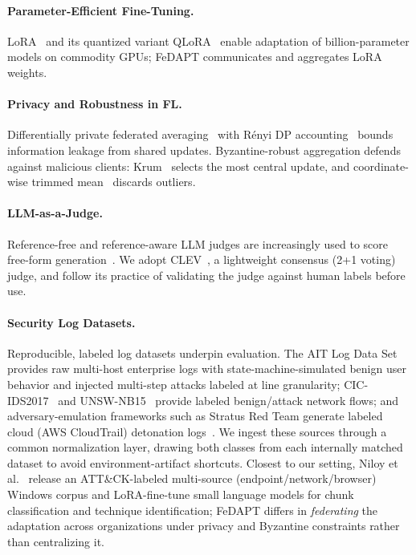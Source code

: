 \documentclass[11pt,a4paper]{article}
\begin{document}
\paragraph{Parameter-Efficient Fine-Tuning.} LoRA~\cite{hu2021lora} and its quantized variant QLoRA~\cite{dettmers2023qlora} enable adaptation of billion-parameter models on commodity GPUs; FeDAPT communicates and aggregates LoRA weights.

\paragraph{Privacy and Robustness in FL.} Differentially private federated averaging~\cite{mcmahan2018dpfedavg} with R\'enyi DP accounting~\cite{mironov2017rdp,yousefpour2021opacus} bounds information leakage from shared updates. Byzantine-robust aggregation defends against malicious clients: Krum~\cite{blanchard2017krum} selects the most central update, and coordinate-wise trimmed mean~\cite{yin2018byzantine} discards outliers.

\paragraph{LLM-as-a-Judge.} Reference-free and reference-aware LLM judges are increasingly used to score free-form generation~\cite{zheng2023judge}. We adopt CLEV~\cite{badshah2025clev}, a lightweight consensus (2+1 voting) judge, and follow its practice of validating the judge against human labels before use.

\paragraph{Security Log Datasets.} Reproducible, labeled log datasets underpin evaluation. The AIT Log Data Set~\cite{landauer2022ait} provides raw multi-host enterprise logs with state-machine-simulated benign user behavior and injected multi-step attacks labeled at line granularity; CIC-IDS2017~\cite{sharafaldin2017cicids} and UNSW-NB15~\cite{moustafa2015unsw} provide labeled benign/attack network flows; and adversary-emulation frameworks such as Stratus Red Team generate labeled cloud (AWS CloudTrail) detonation logs~\cite{stratus2023}. We ingest these sources through a common normalization layer, drawing both classes from each internally matched dataset to avoid environment-artifact shortcuts. Closest to our setting, Niloy et al.~\cite{niloy2026multisource} release an ATT\&CK-labeled multi-source (endpoint/network/browser) Windows corpus and LoRA-fine-tune small language models for chunk classification and technique identification; FeDAPT differs in \emph{federating} the adaptation across organizations under privacy and Byzantine constraints rather than centralizing it.
\end{document}
